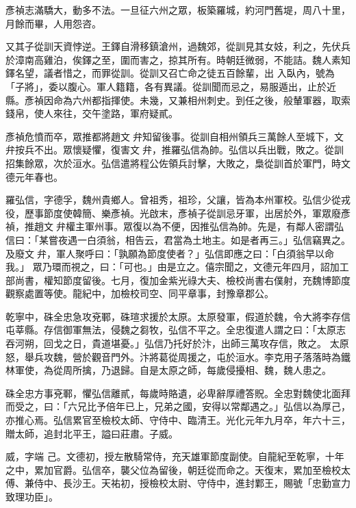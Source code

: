 \begin{pinyinscope}
 彥禎志滿驕大，動多不法。一旦征六州之眾，板築羅城，約河門舊堤，周八十里，月餘而畢，人用怨咨。



 又其子從訓天資悖逆。王鐸自滑移鎮滄州，過魏郊，從訓見其女妓，利之，先伏兵於漳南高雞泊，俟鐸之至，圍而害之，掠其所有。時朝廷微弱，不能詰。魏人素知鐸名望，議者惜之，而罪從訓。從訓又召亡命之徒五百餘輩，出
 入臥內，號為「子將」，委以腹心。軍人籍籍，各有異議。從訓聞而忌之，易服遁出，止於近縣。彥禎因命為六州都指揮使。未幾，又兼相州刺史。到任之後，般輦軍器，取索錢帛，使人來往，交午塗路，軍府疑貳。



 彥禎危憤而卒，眾推都將趙文弁知留後事。從訓自相州領兵三萬餘人至城下，文弁按兵不出。眾懷疑懼，復害文弁，推羅弘信為帥。弘信以兵出戰，敗之。從訓招集餘眾，次於洹水。弘信遣將程公佐領兵討擊，大敗之，梟從訓首於軍門，時文
 德元年春也。



 羅弘信，字德孚，魏州貴鄉人。曾祖秀，祖珍，父讓，皆為本州軍校。弘信少從戎役，歷事節度使韓簡、樂彥禎。光啟末，彥禎子從訓忌牙軍，出居於外，軍眾廢彥禎，推趙文弁權主軍州事。眾復以為不便，因推弘信為帥。先是，有鄰人密謂弘信曰：「某嘗夜遇一白須翁，相告云，君當為土地主。如是者再三。」弘信竊異之。及廢文弁，軍人聚呼曰：「孰願為節度使者？」弘信即應之曰：「白須翁早以命我。」
 眾乃環而視之，曰：「可也。」由是立之。僖宗聞之，文德元年四月，詔加工部尚書，權知節度留後。七月，復加金紫光祿大夫、檢校尚書右僕射，充魏博節度觀察處置等使。龍紀中，加檢校司空、同平章事，封豫章郡公。



 乾寧中，硃全忠急攻兗鄆，硃瑄求援於太原。太原發軍，假道於魏，令大將李存信屯莘縣。存信御軍無法，侵魏之芻牧，弘信不平之。全忠復遣人謂之曰：「太原志吞河朔，回戈之日，貴道堪憂。」弘信乃托好於汴，出師三萬攻存信，敗之。
 太原怒，舉兵攻魏，營於觀音門外。汴將葛從周援之，屯於洹水。李克用子落落時為鐵林軍使，為從周所擒，乃退歸。自是太原之師，每歲侵擾相、魏，魏人患之。



 硃全忠方事兗鄆，懼弘信離貳，每歲時賂遺，必卑辭厚禮答貺。全忠對魏使北面拜而受之，曰：「六兄比予倍年已上，兄弟之國，安得以常鄰遇之。」弘信以為厚己，亦推心焉。弘信累官至檢校太師、守侍中、臨清王。光化元年九月卒，年六十三，贈太師，追封北平王，謚曰莊肅。子威。



 威，字端
 己。文德初，授左散騎常侍，充天雄軍節度副使。自龍紀至乾寧，十年之中，累加官爵。弘信卒，襲父位為留後，朝廷從而命之。天復末，累加至檢校太傅、兼侍中、長沙王。天祐初，授檢校太尉、守侍中，進封鄴王，賜號「忠勤宣力致理功臣」。




\end{pinyinscope}
